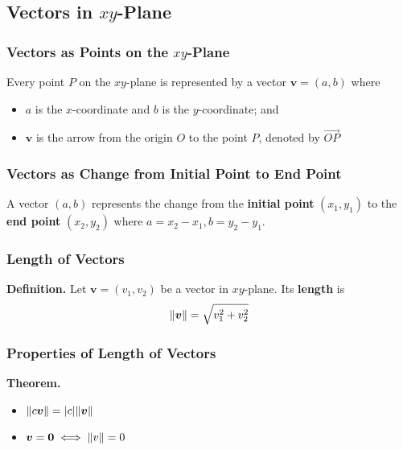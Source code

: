 \documentclass[../ma2001_notes.tex]{subfiles}
\begin{document}
\subsection{Vectors in $xy$-Plane}
\subsubsection{Vectors as Points on the $xy$-Plane}
Every point \(P\) on the \(xy\)-plane is represented by a vector \(\bm{v}=(a,b)\) where
\begin{itemize}
	\item\(a\) is the \(x\)-coordinate and \(b\) is the \(y\)-coordinate; and
	\item\(\bm{v}\) is the arrow from the origin \(O\) to the point \(P\), denoted by \(\overrightarrow{OP}\)
\end{itemize}

\subsubsection{Vectors as Change from Initial Point to End Point}
A vector \((a,b)\) represents the change from the \textbf{initial point} \((x_1,y_1)\) to the \textbf{end point} \((x_2, y_2)\) where \(a=x_2-x_1, b=y_2-y_1\).

\subsubsection{Length of Vectors}
\textbf{Definition.} Let \(\bm{v}=(v_1,v_2)\) be a vector in \(xy\)-plane. Its \textbf{length} is
\[\lVert\bm{v}\rVert=\sqrt{v_1^2+v_2^2}\]

\subsubsection{Properties of Length of Vectors}
\textbf{Theorem.}
\begin{itemize}
	\item\(\lVert c\bm{v}\rVert=\lvert c\rvert\lVert\bm{v}\rVert\)
	\item\(\bm{v}=\bm{0}\iff\lVert v\rVert=0\)
\end{itemize}
\end{document}
